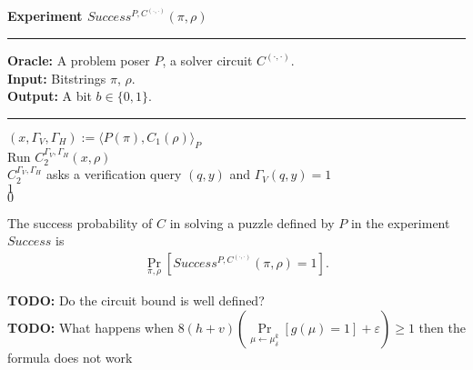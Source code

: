 %
\begin{codeblock}
  \textbf{Experiment $Success^{P, C^{(\cdot, \cdot)}}(\pi, \rho) $}
  \medskip
  \hrule
  \medskip
  \textbf{Oracle:} A problem poser $P$, a solver circuit $C^{(\cdot,\cdot)}$.\\
  \textbf{Input:}  Bitstrings $\pi$, $\rho$.\\
  \textbf{Output:} A bit $b \in \{0,1\}$.
  \medskip\hrule\medskip
  $(x, \Gamma_V, \Gamma_H) := \langle P(\pi), C_1(\rho) \rangle_{P}$ \\
  Run $C_2^{\Gamma_V,\Gamma_H}(x, \rho)$ \\
  \IndI \If $C_2^{\Gamma_V, \Gamma_H}$ asks a verification query $(q, y)$ and $\Gamma_V(q, y) = 1$ \then \\
  \IndII \return $1$ \\
  \return $0$ \\
\end{codeblock}
%
The success probability of $C$ in solving a puzzle defined by $P$ in the experiment $Success$ is
\begin{align}
 \underset{\pi, \rho}{\Pr}[Success^{P,C^{(\cdot, \cdot)}}(\pi, \rho) = 1].
\end{align}
%
\begin{todo}
  \textbf{TODO:} Do the circuit bound is well defined?\\
  \textbf{TODO:} What happens when $8(h+v) \left(\underset{\mu \leftarrow \mu_\delta^k}{\Pr}[g(\mu) = 1] + \varepsilon\right) \geq 1$ then the formula does not work\\
\end{todo}
%

